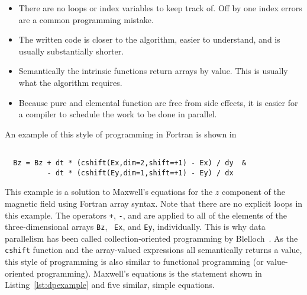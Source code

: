 \begin{itemize}
	\item There are no loops or index variables to keep track of.  Off by one
index errors are a common programming mistake.
        \item The written code is closer to the algorithm, easier to understand, and is usually substantially shorter.
	\item Semantically the intrinsic functions return arrays by value.  This is usually what the algorithm requires.
	\item Because pure and elemental function are free from side effects, it is easier for a compiler to schedule the work to be done in parallel.
\end{itemize}

An example of this style of programming in Fortran is shown in

\begin{verbatim}

  Bz = Bz + dt * (cshift(Ex,dim=2,shift=+1) - Ex) / dy  &
          - dt * (cshift(Ey,dim=1,shift=+1) - Ey) / dx

\end{verbatim}

This example is a solution to Maxwell's equations for the $z$ component of the
magnetic field using Fortran array syntax.  Note that there are no explicit
loops in this example.  The operators {\tt +}, {\tt -}, and {\tt *} are
applied to all of the elements of the three-dimensional arrays {\tt Bz}, {\tt
  Ex}, and {\tt Ey}, individually.  This is why data parallelism has been
called collection-oriented programming by
Blelloch~\cite{blelloch90,rajopadhyedidlacs}.  As the {\tt cshift} function
and the array-valued expressions all semantically returns a value, this style
of programming is also similar to functional programming (or value-oriented
programming). %
Maxwell's equations is the statement shown in Listing~\ref{lst:dpexample} and
five similar, simple equations.



